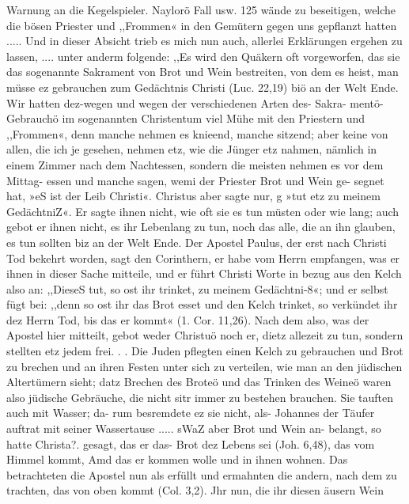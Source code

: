 Warnung an die Kegelspieler. Naylorö Fall usw. 125
wände zu beseitigen, welche die bösen Priester und ,,Frommen«
in den Gemütern gegen uns gepflanzt hatten ..... Und in
dieser Absicht trieb es mich nun auch, allerlei Erklärungen ergehen
zu lassen, .... unter anderm folgende: ,,Es wird den Quäkern
oft vorgeworfen, das sie das sogenannte Sakrament von Brot und
Wein bestreiten, von dem es heist, man müsse ez gebrauchen zum
Gedächtnis Christi (Luc. 22,19) biö an der Welt Ende. Wir
hatten dez-wegen und wegen der verschiedenen Arten des- Sakra-
mentö-Gebrauchö im sogenannten Christentum viel Mühe mit den
Priestern und ,,Frommen«, denn manche nehmen es knieend,
manche sitzend; aber keine von allen, die ich je gesehen, nehmen
etz, wie die Jünger etz nahmen, nämlich in einem Zimmer nach
dem Nachtessen, sondern die meisten nehmen es vor dem Mittag-
essen und manche sagen, wemi der Priester Brot und Wein ge-
segnet hat, »eS ist der Leib Christi«. Christus aber sagte nur, g
»tut etz zu meinem GedächtniZ«. Er sagte ihnen nicht, wie oft
sie es tun müsten oder wie lang; auch gebot er ihnen nicht, es
ihr Lebenlang zu tun, noch das alle, die an ihn glauben, es
tun sollten biz an der Welt Ende. Der Apostel Paulus, der erst
nach Christi Tod bekehrt worden, sagt den Corinthern, er habe vom
Herrn empfangen, was er ihnen in dieser Sache mitteile, und er
führt Christi Worte in bezug aus den Kelch also an: ,,DieseS
tut, so ost ihr trinket, zu meinem Gedächtni-8«; und er selbst fügt
bei: ,,denn so ost ihr das Brot esset und den Kelch trinket, so
verkündet ihr dez Herrn Tod, bis das er kommt« (1. Cor. 11,26).
Nach dem also, was der Apostel hier mitteilt, gebot weder Christuö
noch er, dietz allezeit zu tun, sondern stellten etz jedem frei. . .
Die Juden pflegten einen Kelch zu gebrauchen und Brot zu
brechen und an ihren Festen unter sich zu verteilen, wie man an
den jüdischen Altertümern sieht; datz Brechen des Broteö und das
Trinken des Weineö waren also jüdische Gebräuche, die nicht sitr
immer zu bestehen brauchen. Sie tauften auch mit Wasser; da-
rum besremdete ez sie nicht, als- Johannes der Täufer auftrat
mit seiner Wassertause ..... sWaZ aber Brot und Wein an-
belangt, so hatte Christa?. gesagt, das er das- Brot dez Lebens
sei (Joh. 6,48), das vom Himmel kommt, Amd das er kommen
wolle und in ihnen wohnen. Das betrachteten die Apostel nun
als erfüllt und ermahnten die andern, nach dem zu trachten, das
von oben kommt (Col. 3,2). Jhr nun, die ihr diesen äusern Wein


